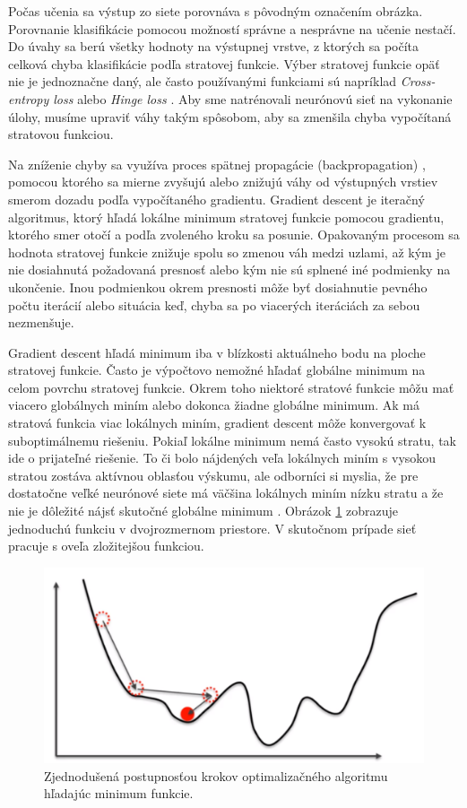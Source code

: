 Počas učenia sa výstup zo siete porovnáva s pôvodným označením obrázka. Porovnanie klasifikácie pomocou možností správne a nesprávne na učenie nestačí. Do úvahy sa berú všetky hodnoty na výstupnej vrstve, z ktorých sa počíta celková chyba klasifikácie podľa stratovej funkcie. Výber stratovej funkcie opäť nie je jednoznačne daný, ale často používanými funkciami sú napríklad \textit{Cross-entropy loss} alebo \textit{Hinge loss} \cite{loss}. Aby sme natrénovali neurónovú sieť na vykonanie úlohy, musíme upraviť váhy takým spôsobom, aby sa zmenšila chyba vypočítaná stratovou funkciou. 

Na zníženie chyby sa využíva proces spätnej propagácie (backpropagation) \cite{bp}, pomocou ktorého sa mierne zvyšujú alebo znižujú váhy od výstupných vrstiev smerom dozadu podľa vypočítaného gradientu. Gradient descent je iteračný algoritmus, ktorý hľadá lokálne minimum stratovej funkcie pomocou gradientu, ktorého smer otočí a podľa zvoleného kroku sa posunie. Opakovaným procesom sa hodnota stratovej funkcie znižuje spolu so zmenou váh medzi uzlami, až kým je nie dosiahnutá požadovaná presnosť alebo kým nie sú splnené iné podmienky na ukončenie. Inou podmienkou okrem presnosti môže byť dosiahnutie pevného počtu iterácií alebo situácia keď, chyba sa po viacerých iteráciách za sebou nezmenšuje.


Gradient descent hľadá minimum iba v blízkosti aktuálneho bodu na ploche stratovej funkcie. Často je výpočtovo nemožné hľadať globálne minimum na celom povrchu stratovej funkcie. Okrem toho niektoré stratové funkcie môžu mať viacero globálnych miním alebo dokonca žiadne globálne minimum. Ak má stratová funkcia viac lokálnych miním, gradient descent môže konvergovať k suboptimálnemu riešeniu. Pokiaľ lokálne minimum nemá často vysokú stratu, tak ide o prijateľné riešenie. To či bolo nájdených veľa lokálnych miním s vysokou stratou zostáva aktívnou oblasťou výskumu, ale odborníci si myslia, že pre dostatočne veľké neurónové siete má väčšina lokálnych miním nízku stratu a že nie je dôležité nájsť skutočné globálne minimum \cite{Goodfellow-et-al-2016}. Obrázok \ref{img:gradient} zobrazuje jednoduchú funkciu v dvojrozmernom priestore. V skutočnom prípade sieť pracuje s oveľa zložitejšou funkciou. 
\\
\begin{figure}[h]
    \centering
    \includegraphics[width=.5\textwidth]{images/02/grad.png}
    \caption{Zjednodušená postupnosťou krokov optimalizačného algoritmu hľadajúc minimum funkcie. \cite{grad}}
    \label{img:gradient}
\end{figure}

